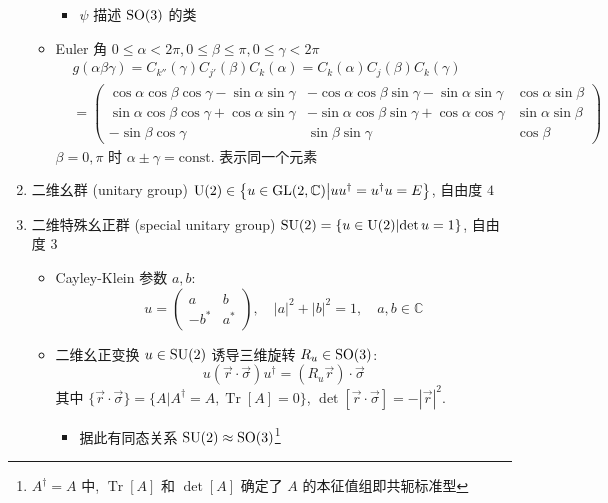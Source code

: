 \documentclass[12pt,a4paper]{article}%
\numberwithin{equation}{section}%
\DeclareMathOperator\Tr{Tr}
\begin{document}
\begin{enumerate}
\begin{itemize}
\begin{itemize}
				\item $\psi$ 描述 $\mathrm{SO}(3)$ 的类
			\end{itemize}
		\item Euler 角 $0\le\alpha < 2\pi, 0\le\beta \le \pi, 0\le\gamma < 2\pi$
		\begin{align}
			&g(\alpha\beta\gamma) = C_{k''}(\gamma) C_{j'}(\beta) C_k(\alpha)
			 = C_k(\alpha)C_j(\beta)C_k(\gamma) \\
			 &= \begin{pmatrix}
			 	\cos\alpha\cos\beta\cos\gamma - \sin\alpha\sin\gamma & -\cos\alpha\cos\beta\sin\gamma - \sin\alpha\sin\gamma & \cos\alpha\sin\beta \\
			 	\sin\alpha\cos\beta\cos\gamma + \cos\alpha\sin\gamma & -\sin\alpha\cos\beta\sin\gamma + \cos\alpha\cos\gamma & \sin\alpha\sin\beta \\
			 	-\sin\beta\cos\gamma & \sin\beta\sin\gamma & \cos\beta
			 \end{pmatrix}
		\end{align}
		$\beta = 0, \pi$ 时 $\alpha\pm\gamma = \mbox{const.}$ 表示同一个元素
	\end{itemize}
	\item 二维幺群 (unitary group) $\mathrm{U}(2) \in \left\{u\in\mathrm{GL}(2,\mathbb C)\middle | uu^\dagger = u^\dagger u = E\right\}$, 自由度 $4$
	\item 二维特殊幺正群 (special unitary group) $\mathrm{SU}(2) = \left\{u\in \mathrm{U}(2)\middle | \det u = 1\right\}$, 自由度 $3$
	\begin{itemize}
		\item Cayley-Klein 参数 $a,b$:
		\begin{equation}\label{equ:su2_ck}
			u = \begin{pmatrix}
				a & b \\
				-b^* & a^*
			\end{pmatrix},\quad |a|^2 + |b|^2 = 1, \quad a,b\in\mathbb C
		\end{equation}
		\item 二维幺正变换 $u\in\mathrm{SU}(2)$ 诱导三维旋转 $R_u\in\mathrm{SO}(3)$:
		\begin{equation}
			u(\vec r\cdot\vec\sigma)u^\dagger = (R_u\vec r)\cdot\vec\sigma
		\end{equation}
		其中 $\{\vec r\cdot \vec \sigma\} = \{A|A^\dagger = A, \Tr[A] = 0\}$, $\det[\vec r\cdot\vec\sigma] = -|\vec r|^2$. 
		\begin{itemize}
			\item 据此有同态关系 $\mathrm{SU}(2)\approx\mathrm{SO}(3)$\footnote{$A^\dagger = A$ 中, $\Tr[A]$ 和 $\det[A]$ 确定了 $A$ 的本征值组即共轭标准型}

\end{itemize}
\end{itemize}
\end{enumerate}
\end{document}
